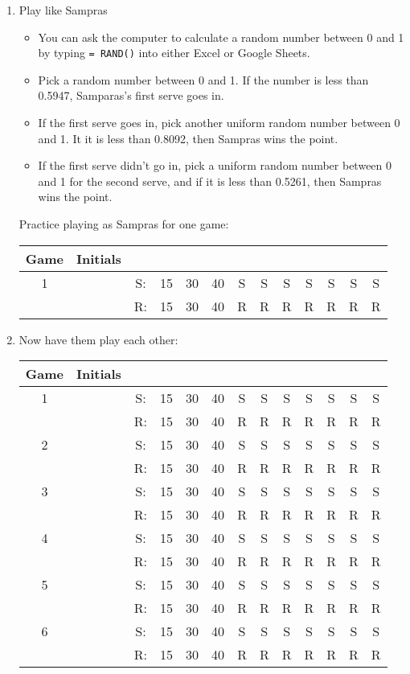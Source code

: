 \begin{enumerate}
	\item Play like Sampras
	\begin{itemize}
		\item You can ask the computer to calculate a random number between 0 and 1 by typing \texttt{= RAND()} into either Excel or Google Sheets.
		\item Pick a random number between 0 and 1. If the number is less than 0.5947, Samparas's first serve goes in.
		\item If the first serve goes in, pick another uniform random number between 0 and 1. It it is less than 0.8092, then Sampras wins the point.
		\item If the first serve didn't go in, pick a uniform random number between 0 and 1 for the second serve, and if it is less than 0.5261, then Sampras wins the point.
	\end{itemize}
	Practice playing as Sampras for one game:
	
	\begin{tabular}{*{13}{c}}
	Game  & Initials&\\
	\hline
	1 & & S: & 15 & 30 & 40 & S &S &S &S &S &S &S\\
	&&    R: & 15 & 30 & 40 & R &R &R &R &R &R &R\\ \hline\end{tabular}
	
	\clearpage
	\item Now have them play each other:
	
	\begin{tabular}{*{13}{c}}
	Game  & Initials&\\
	\hline
	1 & & S: & 15 & 30 & 40 & S &S &S &S &S &S &S\\
	&&    R: & 15 & 30 & 40 & R &R &R &R &R &R &R\\ \hline
	2 & & S: & 15 & 30 & 40 & S &S &S &S &S &S &S\\
	&&    R: & 15 & 30 & 40 & R &R &R &R &R &R &R\\ \hline
	3 & & S: & 15 & 30 & 40 & S &S &S &S &S &S &S\\
	&&    R: & 15 & 30 & 40 & R &R &R &R &R &R &R\\ \hline
	4 & & S: & 15 & 30 & 40 & S &S &S &S &S &S &S\\
	&&    R: & 15 & 30 & 40 & R &R &R &R &R &R &R\\ \hline
	5 & & S: & 15 & 30 & 40 & S &S &S &S &S &S &S\\
	&&    R: & 15 & 30 & 40 & R &R &R &R &R &R &R\\ \hline
	6 & & S: & 15 & 30 & 40 & S &S &S &S &S &S &S\\
	&&    R: & 15 & 30 & 40 & R &R &R &R &R &R &R\\ \hline
	\end{tabular}
	

\end{enumerate}
